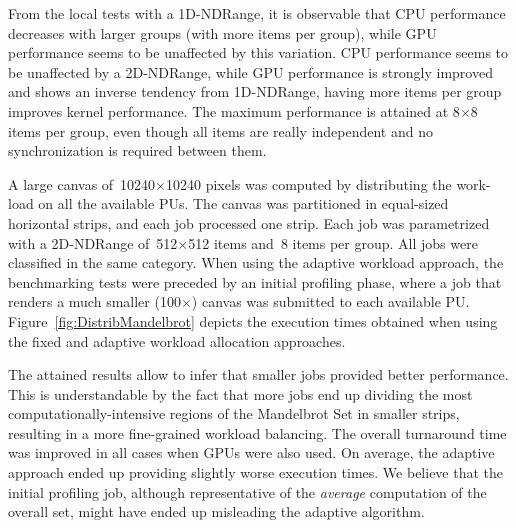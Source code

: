 \documentclass[runningheads,a4paper]{llncs}
\begin{document}

From the local tests with a 1D-NDRange, it is observable that CPU performance decreases with larger groups (with more items per group), while GPU performance seems to be unaffected by this variation. CPU performance seems to be unaffected by a 2D-NDRange, while GPU performance is strongly improved and shows an inverse tendency from 1D-NDRange, having more items per group improves kernel performance. The maximum performance is attained at 8$\times$8 items per group, even though all items are really independent and no synchronization is required between them.





A large canvas of~10240$\times$10240 pixels was computed by distributing the work-load on all the available PUs. The canvas was partitioned in equal-sized horizontal strips, and each job processed one strip. Each job was parametrized with a 2D-NDRange of~512$\times$512 items and~8 items per group. All jobs were classified in the same category. When using the adaptive workload approach, the benchmarking tests were preceded by an initial profiling phase, where a job that renders a much smaller (100$\times$) canvas was submitted to each available PU\@. Figure~\ref{fig:DistribMandelbrot} depicts the execution times obtained when using the fixed and adaptive workload allocation approaches.


The attained results allow to infer that smaller jobs provided better performance. This is understandable by the fact that more jobs end up dividing the most computationally-intensive regions of the Mandelbrot Set in smaller strips, resulting in a more fine-grained workload balancing. The overall turnaround time was improved in all cases when GPUs were also used. On average, the adaptive approach ended up providing slightly worse execution times.  We believe that the initial profiling job, although representative of the \emph{average} computation of the overall set, might have ended up misleading the adaptive algorithm. 
\end{document}
